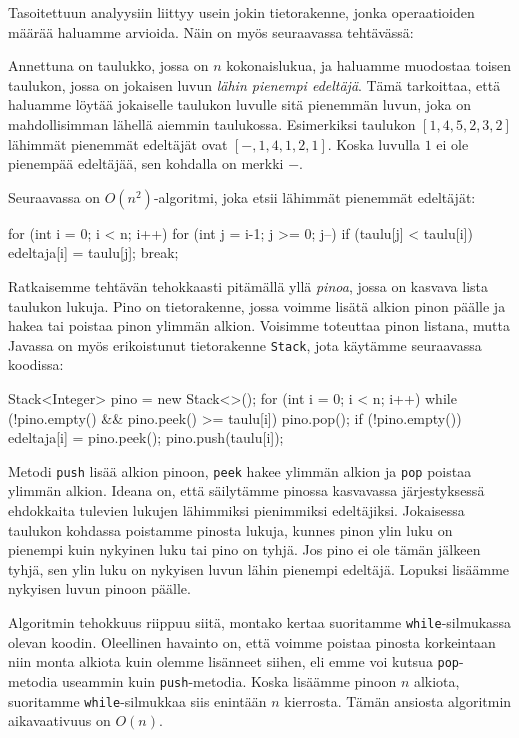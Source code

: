 Tasoitettuun analyysiin liittyy usein jokin tietorakenne,
jonka operaatioiden määrää haluamme arvioida.
Näin on myös seuraavassa tehtävässä:

Annettuna on taulukko, jossa on $n$ kokonaislukua,
ja haluamme muodostaa toisen taulukon,
jossa on jokaisen luvun \emph{lähin pienempi edeltäjä}.
Tämä tarkoittaa, että haluamme löytää jokaiselle taulukon luvulle
sitä pienemmän luvun, joka on mahdollisimman lähellä aiemmin taulukossa.
Esimerkiksi taulukon $[1,4,5,2,3,2]$
lähimmät pienemmät edeltäjät ovat $[-,1,4,1,2,1]$.
Koska luvulla $1$ ei ole pienempää edeltäjää,
sen kohdalla on merkki $-$.

Seuraavassa on $O(n^2)$-algoritmi, joka etsii
lähimmät pienemmät edeltäjät:

\begin{code}
for (int i = 0; i < n; i++) {
    for (int j = i-1; j >= 0; j--) {
        if (taulu[j] < taulu[i]) {
            edeltaja[i] = taulu[j];
            break;
        }
    }
}
\end{code}

Ratkaisemme tehtävän tehokkaasti pitämällä yllä \emph{pinoa},
jossa on kasvava lista taulukon lukuja.
Pino on tietorakenne, jossa voimme lisätä alkion pinon päälle
ja hakea tai poistaa pinon ylimmän alkion.
Voisimme toteuttaa pinon listana,
mutta Javassa on myös erikoistunut tietorakenne \texttt{Stack},
jota käytämme seuraavassa koodissa:

\begin{code}
Stack<Integer> pino = new Stack<>();
for (int i = 0; i < n; i++) {
    while (!pino.empty() && pino.peek() >= taulu[i]) {
        pino.pop();
    }
    if (!pino.empty()) {
        edeltaja[i] = pino.peek();
    }
    pino.push(taulu[i]);
}
\end{code}

Metodi \texttt{push} lisää alkion pinoon,
\texttt{peek} hakee ylimmän alkion ja \texttt{pop}
poistaa ylimmän alkion.
Ideana on, että säilytämme pinossa kasvavassa järjestyk\-sessä
ehdokkaita tulevien lukujen lähimmiksi pienimmiksi edeltäjiksi.
Jokaisessa taulukon kohdassa poistamme
pinosta lukuja, kunnes pinon ylin luku on pienempi kuin nykyinen luku
tai pino on tyhjä.
Jos pino ei ole tämän jälkeen tyhjä, sen ylin luku on nykyisen luvun
lähin pienempi edeltäjä.
Lopuksi lisäämme nykyisen luvun pinoon päälle.

Algoritmin tehokkuus riippuu siitä, montako kertaa suoritamme
\texttt{while}-silmukassa olevan koodin.
Oleellinen havainto on, että voimme poistaa pinosta
korkeintaan niin monta alkiota kuin olemme lisänneet siihen,
eli emme voi kutsua \texttt{pop}-metodia useammin kuin \texttt{push}-metodia.
Koska lisäämme pinoon $n$ alkiota, suoritamme \texttt{while}-silmukkaa
siis enintään $n$ kierrosta.
Tämän ansiosta algoritmin aikavaativuus on $O(n)$.